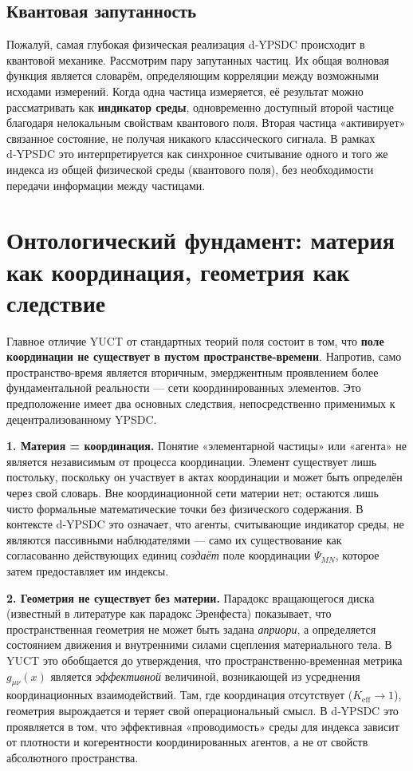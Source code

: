 \documentclass[11pt,a4paper]{article}
\begin{document}
	\subsection{Квантовая запутанность}
	
	Пожалуй, самая глубокая физическая реализация d‑YPSDC происходит в квантовой механике. Рассмотрим пару запутанных частиц. Их общая волновая функция является словарём, определяющим корреляции между возможными исходами измерений. Когда одна частица измеряется, её результат можно рассматривать как \textbf{индикатор среды}, одновременно доступный второй частице благодаря нелокальным свойствам квантового поля. Вторая частица «активирует» связанное состояние, не получая никакого классического сигнала. В рамках d‑YPSDC это интерпретируется как синхронное считывание одного и того же индекса из общей физической среды (квантового поля), без необходимости передачи информации между частицами.
	
	\section{Онтологический фундамент: материя как координация, геометрия как следствие}
	
	Главное отличие YUCT от стандартных теорий поля состоит в том, что \textbf{поле координации не существует в пустом пространстве-времени}. Напротив, само пространство-время является вторичным, эмерджентным проявлением более фундаментальной реальности — сети координированных элементов. Это предположение имеет два основных следствия, непосредственно применимых к децентрализованному YPSDC.
	
	\textbf{1. Материя = координация.} Понятие «элементарной частицы» или «агента» не является независимым от процесса координации. Элемент существует лишь постольку, поскольку он участвует в актах координации и может быть определён через свой словарь. Вне координационной сети материи нет; остаются лишь чисто формальные математические точки без физического содержания. В контексте d‑YPSDC это означает, что агенты, считывающие индикатор среды, не являются пассивными наблюдателями — само их существование как согласованно действующих единиц \emph{создаёт} поле координации \(\Psi_{MN}\), которое затем предоставляет им индексы.
	
	\textbf{2. Геометрия не существует без материи.} Парадокс вращающегося диска (известный в литературе как парадокс Эренфеста) показывает, что пространственная геометрия не может быть задана \emph{априори}, а определяется состоянием движения и внутренними силами сцепления материального тела. В YUCT это обобщается до утверждения, что пространственно-временная метрика \(g_{\mu\nu}(x)\) является \emph{эффективной} величиной, возникающей из усреднения координационных взаимодействий. Там, где координация отсутствует (\(K_{\mathrm{eff}} \to 1\)), геометрия вырождается и теряет свой операциональный смысл. В d‑YPSDC это проявляется в том, что эффективная «проводимость» среды для индекса зависит от плотности и когерентности координированных агентов, а не от свойств абсолютного пространства.
	
\end{document}
